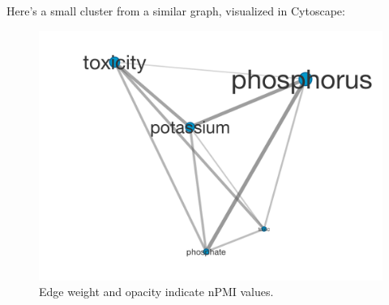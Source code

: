 \documentclass[letterpaper,10pt,english]{sphinxmanual}
\begin{document}
\begin{fulllineitems}
Here's a small cluster from a similar graph, visualized in Cytoscape:
\begin{figure}[htbp]
\centering
\capstart

\includegraphics{nPMI_phosphorus.png}
\caption{Edge weight and opacity indicate nPMI values.}\end{figure}

\end{fulllineitems}

\end{document}
